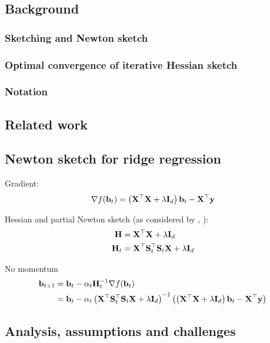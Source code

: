 \subsection{Background} \label{sec:background}

\subsubsection{Sketching and Newton sketch}

\subsubsection{Optimal convergence of iterative Hessian sketch}

\subsubsection{Notation}

\subsection{Related work} \label{sec:literature}

\subsection{Newton sketch for ridge regression} \label{sec:theory}

\todo
Gradient:
\[
\nabla f(\mathbf{b}_t) = \left(\mathbf{X}^\top\mathbf{X}+\lambda\mathbf{I}_d\right)\mathbf{b}_t - \mathbf{X}^\top\mathbf{y}
\]

Hessian and partial Newton sketch (as considered by \citet{Chowdhury:2018}, \citet{Wang:2017}):
\begin{align*}
\mathbf{H} &= \mathbf{X}^\top\mathbf{X}+\lambda\mathbf{I}_d \\
\mathbf{H}_t &= \mathbf{X}^\top\mathbf{S}_t^\top\mathbf{S}_t\mathbf{X} + \lambda\mathbf{I}_d
\end{align*}

No momentum
\begin{align*}
\mathbf{b}_{t+1} &= \mathbf{b}_t - \alpha_t\mathbf{H}_t^{-1}\nabla f(\mathbf{b}_t) \\
&= \mathbf{b}_t - \alpha_t\left(\mathbf{X}^\top\mathbf{S}_t^\top\mathbf{S}_t\mathbf{X} + \lambda\mathbf{I}_d\right)^{-1}\left(\left(\mathbf{X}^\top\mathbf{X}+\lambda\mathbf{I}_d\right)\mathbf{b}_t-\mathbf{X}^\top\mathbf{y}\right)
\end{align*}

\subsection{Analysis, assumptions and challenges}

